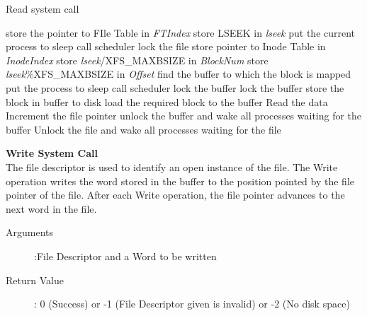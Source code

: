 \documentclass[10pt]{article}
\begin{document}
\begin{algorithm}
\caption{Read system call}
\begin{algorithmic}
\ENDIF
{}
\ELSE 
    \STATE store the pointer to FIle Table in  \textit{FTIndex}
    \STATE store LSEEK in  \textit{lseek}
\ENDIF
{}
    \STATE put the current process to sleep
    \STATE call scheduler
\ENDWHILE
\STATE lock the file
\STATE store pointer to Inode Table in  \textit{InodeIndex}
\ELSE 
    \STATE store \textit{lseek}/XFS\_MAXBSIZE in \textit{BlockNum}
    \STATE store \textit{lseek}\%XFS\_MAXBSIZE in \textit{Offset}
\ENDIF
\STATE find the buffer to which the block is mapped
            \STATE put the process to sleep
            \STATE call scheduler
        \ENDWHILE
        \STATE lock the buffer
    \ENDIF
\ELSE
    \STATE lock the buffer
\ENDIF
{}
        \STATE store the block in buffer to disk
    \ENDIF
    \STATE load the required block to the buffer
\ENDIF
\STATE Read the data
\STATE Increment the file pointer
\STATE unlock the buffer and wake all processes waiting for the buffer
\STATE Unlock the file and wake all processes waiting for the file
\end{algorithmic}
\end{algorithm}
\vspace{3mm}
\textbf{Write System Call}
\vspace{2mm}\\
The file descriptor is used to identify an open instance of the file. The Write operation writes the word stored in the buffer to the position pointed by the file pointer of the file. After each Write operation, the file pointer advances to the next word in the file.
\begin{description}
	\item[Arguments]:File Descriptor and a Word to be written
	\item[Return Value]: 0 (Success) or -1 (File Descriptor given is invalid) or -2 (No disk space)
\end{description} 
\end{document}

